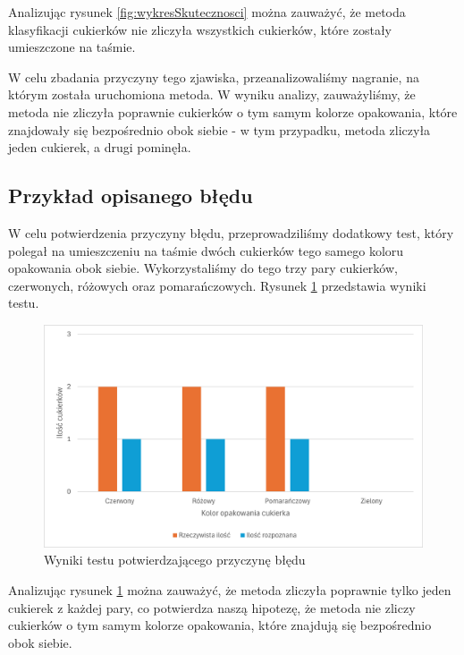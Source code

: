 \documentclass{article}
\begin{document}
Analizując rysunek \ref{fig:wykresSkutecznosci} można zauważyć, że metoda klasyfikacji cukierków nie zliczyła wszystkich cukierków, które zostały umieszczone na taśmie.

W celu zbadania przyczyny tego zjawiska, przeanalizowaliśmy nagranie, na którym została uruchomiona metoda. W wyniku analizy, zauważyliśmy, że metoda nie zliczyła poprawnie cukierków o tym samym kolorze opakowania, które znajdowały się bezpośrednio obok siebie - w tym przypadku, metoda zliczyła jeden cukierek, a drugi pominęła.

\subsection{Przykład opisanego błędu}
\label{Przykład opisanego błędu}
W celu potwierdzenia przyczyny błędu, przeprowadziliśmy dodatkowy test, który polegał na umieszczeniu na taśmie dwóch cukierków tego samego koloru opakowania obok siebie. Wykorzystaliśmy do tego trzy pary cukierków, czerwonych, różowych oraz pomarańczowych. Rysunek \ref{fig:wykresBledu} przedstawia wyniki testu.

\begin{figure}[H]
    \centering
    \label{fig:wykresBledu}
    \includegraphics{wykresBledu}
    \caption{Wyniki testu potwierdzającego przyczynę błędu}
\end{figure}

Analizując rysunek \ref{fig:wykresBledu} można zauważyć, że metoda zliczyła poprawnie tylko jeden cukierek z każdej pary, co potwierdza naszą hipotezę, że metoda nie zliczy cukierków o tym samym kolorze opakowania, które znajdują się bezpośrednio obok siebie.
\end{document}
